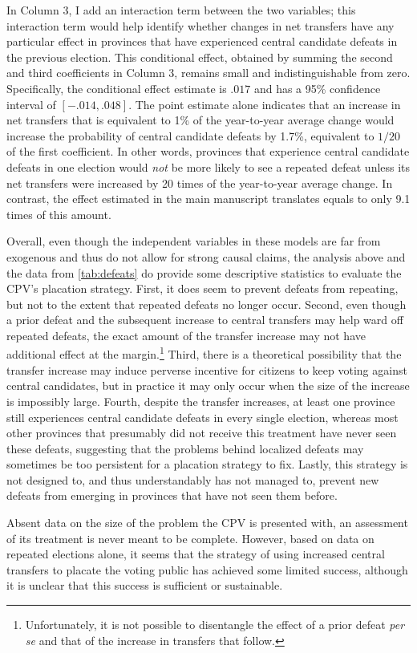 \documentclass[12pt]{article}
\newcommand\fnote[1]{\footnote{\baselineskip=2\normalbaselineskip#1}}
\newcommand{\1}{\mathbbm{1}}
\begin{document}
In Column 3, I add an interaction term between the two variables; this interaction term would help identify whether changes in net transfers have any particular effect in provinces that have experienced central candidate defeats in the previous election. This conditional effect, obtained by summing the second and third coefficients in Column 3, remains small and indistinguishable from zero. Specifically, the conditional effect estimate is $.017$ and has a 95\% confidence interval of $[-.014,.048]$. The point estimate alone indicates that an increase in net transfers that is equivalent to 1\% of the year-to-year average change would increase the probability of central candidate defeats by 1.7\%, equivalent to $1/20$ of the first coefficient. In other words, provinces that experience central candidate defeats in one election would \textit{not} be more likely to see a repeated defeat unless its net transfers were increased by 20 times of the year-to-year average change. In contrast, the effect estimated in the main manuscript translates equals to only 9.1 times of this amount.

Overall, even though the independent variables in these models are far from exogenous and thus do not allow for strong causal claims, the analysis above and the data from \autoref{tab:defeats} do provide some descriptive statistics to evaluate the CPV's placation strategy. First, it does seem to prevent defeats from repeating, but not to the extent that repeated defeats no longer occur. Second, even though a prior defeat and the subsequent increase to central transfers may help ward off repeated defeats, the exact amount of the transfer increase may not have additional effect at the margin.\fnote{Unfortunately, it is not possible to disentangle the effect of a prior defeat \textit{per se} and that of the increase in transfers that follow.} Third, there is a theoretical possibility that the transfer increase may induce perverse incentive for citizens to keep voting against central candidates, but in practice it may only occur when the size of the increase is impossibly large. Fourth, despite the transfer increases, at least one province still experiences central candidate defeats in every single election, whereas most other provinces that presumably did not receive this treatment have never seen these defeats, suggesting that the problems behind localized defeats may sometimes be too persistent for a placation strategy to fix. Lastly, this strategy is not designed to, and thus understandably has not managed to, prevent new defeats from emerging in provinces that have not seen them before.

Absent data on the size of the problem the CPV is presented with, an assessment of its treatment is never meant to be complete. However, based on data on repeated elections alone, it seems that the strategy of using increased central transfers to placate the voting public has achieved some limited success, although it is unclear that this success is sufficient or sustainable.

\clearpage
{}
\printbibliography[heading=bibintoc]
\end{document}

